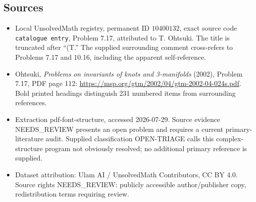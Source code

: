\documentclass[11pt]{article}
\begin{document}
\subsection{Sources}
\begin{itemize}
\item Local UnsolvedMath registry, permanent ID \(10400132\), exact source code \texttt{catalogue entry}, Problem 7.17, attributed to T. Ohtsuki. The title is truncated after ``(T.'' The supplied surrounding comment cross-refers to Problems 7.17 and 10.16, including the apparent self-reference.
\item Ohtsuki, \emph{Problems on invariants of knots and 3-manifolds} (2002), Problem 7.17, PDF page 112: \url{https://msp.org/gtm/2002/04/gtm-2002-04-024s.pdf}. Bold printed headings distinguish 231 numbered items from surrounding references.
\item Extraction pdf-font-structure, accessed 2026-07-29. Source evidence NEEDS\_REVIEW presents an open problem and requires a current primary-literature audit. Supplied classification OPEN-TRIAGE calls this complex-structure program not obviously resolved; no additional primary reference is supplied.
\item Dataset attribution: Ulam AI / UnsolvedMath Contributors, CC BY 4.0. Source rights NEEDS\_REVIEW: publicly accessible author/publisher copy, redistribution terms requiring review.
\end{itemize}
\end{document}
